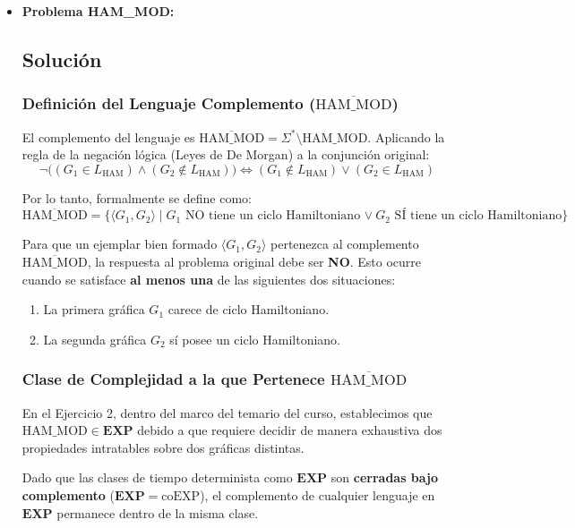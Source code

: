 \begin{itemize}[leftmargin=*]
    \vspace{0.5cm}
    \item \textbf{Problema HAM\_MOD:}
    \subsection*{Solución}
    \subsubsection*{Definición del Lenguaje Complemento ($\overline{\text{HAM\_MOD}}$)}

    El complemento del lenguaje es $\overline{\text{HAM\_MOD}} = \Sigma^* \setminus \text{HAM\_MOD}$. Aplicando la regla de la negación lógica (Leyes de De Morgan) a la conjunción original:
    \[ \neg \Big( (G_1 \in L_{\text{HAM}}) \land (G_2 \notin L_{\text{HAM}}) \Big) \iff (G_1 \notin L_{\text{HAM}}) \lor (G_2 \in L_{\text{HAM}}) \]

    Por lo tanto, formalmente se define como:
    \[ \overline{\text{HAM\_MOD}} = \{ \langle G_1, G_2 \rangle \mid G_1 \text{ NO tiene un ciclo Hamiltoniano } \mathbf{\lor} \ G_2 \text{ SÍ tiene un ciclo Hamiltoniano} \} \]

    Para que un ejemplar bien formado $\langle G_1, G_2 \rangle$ pertenezca al complemento $\overline{\text{HAM\_MOD}}$, la respuesta al problema original debe ser \textbf{NO}. Esto ocurre cuando se satisface \textbf{al menos una} de las siguientes dos situaciones:
    \begin{enumerate}[label=\arabic*., leftmargin=*]
        \item La primera gráfica $G_1$ carece de ciclo Hamiltoniano.
        \item La segunda gráfica $G_2$ sí posee un ciclo Hamiltoniano.
    \end{enumerate}

    \subsubsection*{Clase de Complejidad a la que Pertenece $\overline{\text{HAM\_MOD}}$}

    En el Ejercicio 2, dentro del marco del temario del curso, establecimos que $\text{HAM\_MOD} \in \mathbf{EXP}$ debido a que requiere decidir de manera exhaustiva dos propiedades intratables sobre dos gráficas distintas.

    Dado que las clases de tiempo determinista como $\mathbf{EXP}$ son \textbf{cerradas bajo complemento} ($\mathbf{EXP} = \text{coEXP}$), el complemento de cualquier lenguaje en $\mathbf{EXP}$ permanece dentro de la misma clase.


\end{itemize}
